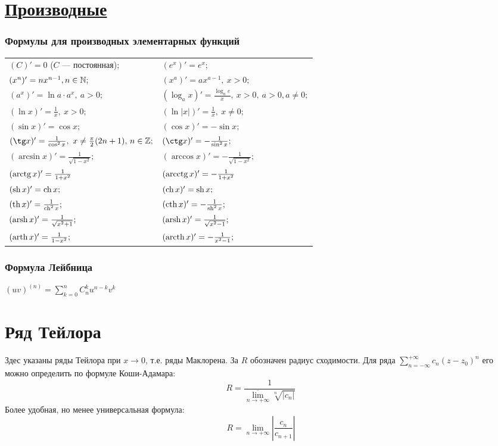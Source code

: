 \section[Производные]{\href{https://ru.wikipedia.org/wiki/\%D0\%9F\%D1\%80\%D0\%BE\%D0\%B8\%D0\%B7\%D0\%B2\%D0\%BE\%D0\%B4\%D0\%BD\%D0\%B0\%D1\%8F\_\%D1\%84\%D1\%83\%D0\%BD\%D0\%BA\%D1\%86\%D0\%B8\%D0\%B8}{Производные}}

\subsubsection{Формулы для производных элементарных функций}
\noindent\begin{longtable}[l]{ l l }
$(C)'=0$ ($C$ --- постоянная); 
&
$(e^x)'=e^x;$
\\
$(x^n)' = nx^{n-1}, n\in \mathbb{N};$
&
$(x^a)'=ax^{a-1},\ x>0;$
\\
$(a^x)'=\ln a\cdot a^x,\ a>0;$
&
$(\log_a x)'=\frac{\log_a e}{x},\ x>0,\ a>0, a\ne 0;$
\\
$(\ln x)' = \frac{1}{x},\ x>0;$
&
$(\ln |x|)' = \frac{1}{x},\ x\ne 0;$
\\
$(\sin x)'=\cos x;$
&
$(\cos x)'=-\sin x;$
\\
$(\tg x)'= \frac{1}{\cos^2 x},\ x \ne \frac{\pi}{2}(2n+1),\, n\in \bbZ;$
&
$(\ctg x)'= -\frac{1}{\sin^2 x};$ 
\\
$(\arcsin x)' = \frac{1}{\sqrt{1-x^2}};$
&
$(\arccos x)' = -\frac{1}{\sqrt{1-x^2}};$
\\
$(\mathop{\rm arctg}\nolimits x)' = \frac{1}{1+x^2}$
&
$(\mathop{\rm arcctg}\nolimits x)' = -\frac{1}{1+x^2}$
\\
$(\mathop{\rm sh}\nolimits x)'= \mathop{\rm ch}\nolimits x;$
&
$(\mathop{\rm ch}\nolimits x)'= \mathop{\rm sh}\nolimits x;$
\\
$(\mathop{\rm th}\nolimits x)'= \frac{1}{\mathop{\rm ch}\nolimits^2 x};$
&
$(\mathop{\rm cth}\nolimits x)'= -\frac{1}{\mathop{\rm sh}\nolimits^2 x};$
\\
$(\mathop{\rm arsh}\nolimits x)'=\frac{1}{\sqrt{x^2+1}};$
&
$(\mathop{\rm arsh}\nolimits x)'=\frac{1}{\sqrt{x^2-1}};$
\\
$(\mathop{\rm arth}\nolimits x)'=\frac{1}{1-x^2};$
&
$(\mathop{\rm arcth}\nolimits x)'=-\frac{1}{x^2-1};$
\end{longtable}
\subsubsection{Формула Лейбница}
$(uv)^{(n)}=\sum\limits^n_{k=0} C^k_n u^{n-k} v^{k}$

\section[Ряд Тейлора]{Ряд Тейлора}

\begin{notion}
Здес указаны ряды Тейлора при $x \to 0$, т.е. ряды Маклорена. За $R$ обозначен радиус сходимости. Для ряда $\sum\limits_{n=-\infty}^{+\infty} c_n (z-z_0)^n $ его можно определить по формуле Коши-Адамара:
$$
R = \frac{1}{\overline{\lim\limits_{n \to + \infty}} \sqrt[n]{|c_n|}}
$$
Более удобная, но менее универсальная формула:$$
R = \lim\limits_{n \to + \infty} \left| \frac{c_n}{c_{n + 1}} \right|
$$
\end{notion}


